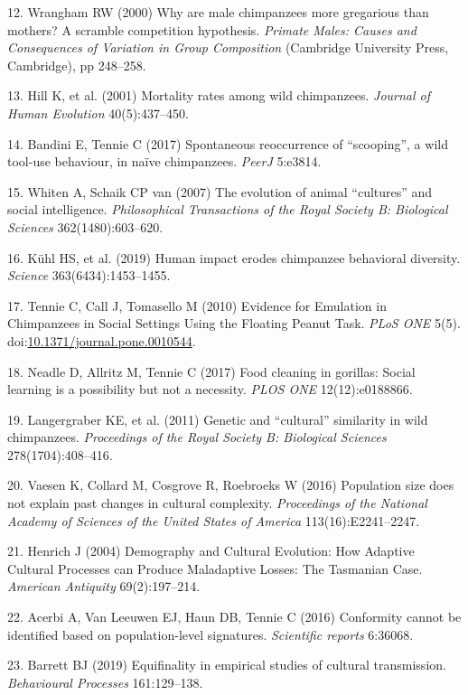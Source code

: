 \documentclass[9pt,twocolumn,twoside,]{pnas-new}
\begin{document}
\hypertarget{ref-wrangham_why_2000}{}
12. Wrangham RW (2000) Why are male chimpanzees more gregarious than
mothers? A scramble competition hypothesis. \emph{Primate Males: Causes
and Consequences of Variation in Group Composition} (Cambridge
University Press, Cambridge), pp 248--258.

\hypertarget{ref-hill_mortality_2001}{}
13. Hill K, et al. (2001) Mortality rates among wild chimpanzees.
\emph{Journal of Human Evolution} 40(5):437--450.

\hypertarget{ref-bandini_spontaneous_2017}{}
14. Bandini E, Tennie C (2017) Spontaneous reoccurrence of ``scooping'',
a wild tool-use behaviour, in naïve chimpanzees. \emph{PeerJ} 5:e3814.

\hypertarget{ref-whiten_evolution_2007}{}
15. Whiten A, Schaik CP van (2007) The evolution of animal ``cultures''
and social intelligence. \emph{Philosophical Transactions of the Royal
Society B: Biological Sciences} 362(1480):603--620.

\hypertarget{ref-kuhl_human_2019}{}
16. Kühl HS, et al. (2019) Human impact erodes chimpanzee behavioral
diversity. \emph{Science} 363(6434):1453--1455.

\hypertarget{ref-tennie_evidence_2010}{}
17. Tennie C, Call J, Tomasello M (2010) Evidence for Emulation in
Chimpanzees in Social Settings Using the Floating Peanut Task.
\emph{PLoS ONE} 5(5).
doi:\href{https://doi.org/10.1371/journal.pone.0010544}{10.1371/journal.pone.0010544}.

\hypertarget{ref-neadle_food_2017}{}
18. Neadle D, Allritz M, Tennie C (2017) Food cleaning in gorillas:
Social learning is a possibility but not a necessity. \emph{PLOS ONE}
12(12):e0188866.

\hypertarget{ref-langergraber_genetic_2011}{}
19. Langergraber KE, et al. (2011) Genetic and ``cultural'' similarity
in wild chimpanzees. \emph{Proceedings of the Royal Society B:
Biological Sciences} 278(1704):408--416.

\hypertarget{ref-vaesen_population_2016}{}
20. Vaesen K, Collard M, Cosgrove R, Roebroeks W (2016) Population size
does not explain past changes in cultural complexity. \emph{Proceedings
of the National Academy of Sciences of the United States of America}
113(16):E2241--2247.

\hypertarget{ref-henrich_demography_2004}{}
21. Henrich J (2004) Demography and Cultural Evolution: How Adaptive
Cultural Processes can Produce Maladaptive Losses: The Tasmanian Case.
\emph{American Antiquity} 69(2):197--214.

\hypertarget{ref-acerbi_conformity_2016}{}
22. Acerbi A, Van Leeuwen EJ, Haun DB, Tennie C (2016) Conformity cannot
be identified based on population-level signatures. \emph{Scientific
reports} 6:36068.

\hypertarget{ref-barrett_equifinality_2019}{}
23. Barrett BJ (2019) Equifinality in empirical studies of cultural
transmission. \emph{Behavioural Processes} 161:129--138.



% 
\end{document}
